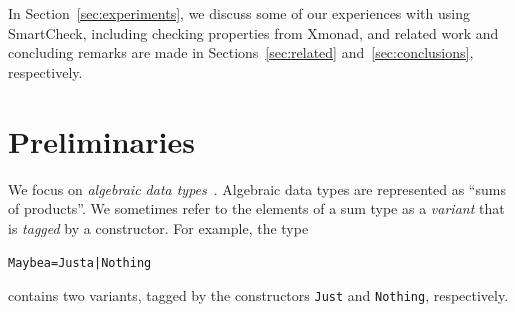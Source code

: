 \documentclass{sigplanconf}
\newenvironment{code}{\begin{alltt}}{\end{alltt}}
\newcommand{\ttp}[1]{\texttt{#1}}
\begin{document}
\noindent
In Section~\ref{sec:experiments}, we discuss some of our experiences with using
SmartCheck, including checking properties from Xmonad, and related work and
concluding remarks are made in Sections~\ref{sec:related}
and~\ref{sec:conclusions}, respectively.




\section{Preliminaries}\label{sec:preliminaries}

We focus on \emph{algebraic data types}~\cite{}.  Algebraic data types are
represented as ``sums of products''.  We sometimes refer to the elements of a
sum type as a \emph{variant} that is \emph{tagged} by a constructor.  For
example, the type
%
\begin{code}
Maybe a = Just a | Nothing
\end{code}
%
\noindent
contains two variants, tagged by the constructors \ttp{Just} and \ttp{Nothing},
respectively.
\end{document}
